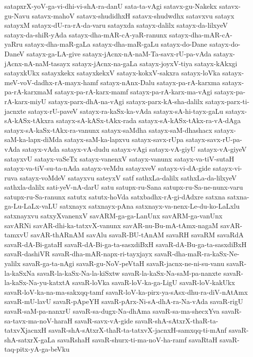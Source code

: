 {satapxrX-yoV-ga-vi-dhi-vi-shA-ra-danU
sata-ta-vAgi
satavx-gu-Nakekx
satavx-gu-Navu
satavx-mahoV
satavx-shudidhxH
satavx-shudwdhx
satavxvu
satayx
satayxM
satayx-dU-ra-rA-da-varu
satayxda
satayx-dalilx
satayx-da-lilxyeV
satayx-da-shiR-yAda
satayx-dha-mAR-cA-yaR-ranunx
satayx-dha-mAR-cA-yaRru
satayx-dha-maR-gaLa
satayx-dha-maR-gaLu
satayx-do-Dane
satayx-do-DaneV
satayx-ga-LA-give
satayx-jAcnx-nA-naM-Ta-savx-rU-pa-vAda
satayx-jAcnx-nA-naM-tasayx
satayx-jAcnx-na-gaLa
satayx-joyxV-tiya
satayx-kAkxgi
satayxkUkx
satayxkekx
satayxkekxV
satayx-kokxV-sakxra
satayx-loVka
satayx-meV-voV-dadhx-rA-mayx-hamf
satayx-nAnx-Dalu
satayx-pa-rA-karxma
satayx-pa-rA-karxmaM
satayx-pa-rA-karx-mamf
satayx-pa-rA-karx-ma-vAgi
satayx-pa-rA-karx-miyU
satayx-parx-dhA-na-vAgi
satayx-parx-kA-sha-dalilx
satayx-parx-ti-jacnxte
satayx-rU-paveV
satayx-ra-kaSx-ka-vAda
satayx-sA-hi-tayx-gaLu
satayx-sA-kASx-tAkxra
satayx-sA-kASx-tAkx-rada
satayx-sA-kASx-tAkx-ra-vA-dAga
satayx-sA-kaSx-tAkx-ra-vanunx
satayx-saMdha
satayx-saM-dhashacx
satayx-saM-ka-lapx-diMda
satayx-saM-ka-lapxvu
satayx-savx-rUpa
satayx-savx-rU-pa-vAda
satayx-vAda
satayx-vA-dudu
satayx-vAgi
satayx-vA-giyU
satayx-vA-giyeV
satayxvU
satayx-vaSeTx
satayx-vanenxV
satayx-vanunx
satayx-va-tiV-sutaH
satayx-va-tiV-su-ta-nAda
satayx-veMdu
satayxveV
satayx-vi-dA-gide
satayx-vi-ruva
satayx-voMdeV
satayxvu
sateyxV
satf
sathxLa-dalilx
sathxLa-da-lilxyeV
sathxla-dalilx
sati-yeV-nA-darU
satu
satupx-ru-Sana
satupx-ru-Sa-ne-nunx-varu
satupx-ru-Sa-ranunx
satutx
satutx-hoVda
satxbadhx-rA-gi-dAdxre
satxna
satxna-ga-Lu-LaLx-vaLU
satxnayx
satxnayx-pAna
satxnayx-va-nenx-Le-du-ko-LaLxlu
satxnayxvu
satxyXvanenxV
savARM-ga-ga-LanUnx
savARM-ga-vanUnx
savARNi
savAR-dhi-ka-tatxvX-vanunx
savAR-nu-Bu-mA-tAmx-nagaM
savAR-tamxvU
savAR-thARnAM
savAlu
savaR-BU-tAnAM
savaRH
savaRM
savaRdA
savaR-dA-Bi-gataH
savaR-dA-Bi-ga-ta-sasxdiBxH
savaR-dA-Bu-ga-ta-sasxdiBxH
savaR-dashiVR
savaR-dha-mAR-napx-ri-tayxjayx
savaR-dha-maR-ra-kaSx-Ne-yalilx
savaR-ga-ta-nAgi
savaR-gu-NoV-peVtaH
savaR-jacnx-ne-ni-su-vanu
savaR-la-kaSxNa
savaR-la-kaSx-Na-la-kiSxtw
savaR-la-kaSx-Na-saM-pa-nanxte
savaR-la-kaSx-Na-yu-katxtA
savaR-loVka
savaR-loV-ka-ga-LigU
savaR-loV-kakUkx
savaR-loV-ka-na-ma-sakxqq-tamf
savaR-loV-ka-pirx-ya-sAsx-dhu-ra-diV-nAtAmx
savaR-mU-lavU
savaR-pApeYH
savaR-pArx-Ni-sA-dhA-ra-Na-vAda
savaR-rigU
savaR-saM-pa-nanxrU
savaR-sa-dugx-Na-dhAma
savaR-sa-ma-shecxYva
savaR-sa-tavx-ma-noV-haraH
savaR-savx-vA-gide
savaR-shA-sAtxrX-thaR-ta-tatxvXjacnxH
savaR-shA-sAtxrX-thaR-ta-tatxvX-jacnxH-samxqq-ti-mAnf
savaR-shA-satxrX-gaLa
savaRshaH
savaR-shurx-ti-ma-noV-ha-ramf
savaRtaH
savaR-taq-pitx-yA-ga-beVku
}
